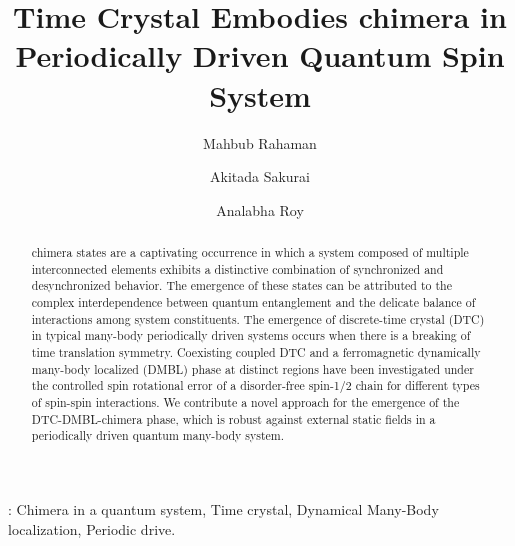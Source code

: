 \documentclass[12pt]{iopart}
\begin{document}
	
	\title{Time Crystal Embodies chimera in Periodically Driven Quantum Spin System}
	\submitto{\NJP}
	\author{Mahbub Rahaman}
	\address{Department of Physics, The University of Burdwan, Burdwan 713104, India}	
	\author{Akitada Sakurai}
	\address{Quantum Information Science and Technology Unit, Okinawa Institute of Science and Technology Graduate University, Onna-son, Okinawa 904-0495, Japan}		
	\author{Analabha Roy}
	\address{Department of Physics, The University of Burdwan, Burdwan 713104, India}
	
	\begin{abstract}
		chimera states are a captivating occurrence in which a system composed of multiple interconnected elements exhibits a distinctive combination of synchronized and desynchronized behavior. The emergence of these states can be attributed to the complex interdependence between quantum entanglement and the delicate balance of interactions among system constituents. The emergence of discrete-time crystal (DTC) in typical many-body periodically driven systems occurs when there is a breaking of time translation symmetry. Coexisting coupled DTC and a ferromagnetic dynamically many-body localized (DMBL) phase at distinct regions have been investigated under the controlled spin rotational error of a disorder-free spin-1/2 chain for different types of spin-spin interactions. We contribute a novel approach for the emergence of the DTC-DMBL-chimera phase, which is robust against external static fields in a periodically driven quantum many-body system.
	\end{abstract}
	: Chimera in a quantum system, Time crystal, Dynamical Many-Body localization, Periodic drive. \\        
	\maketitle
	
\end{document}
